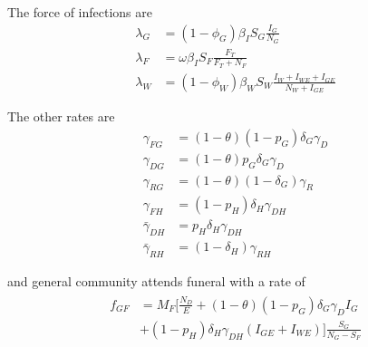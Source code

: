 \documentclass[11pt]{article}
\begin{document}
The force of infections are
\begin{align}
\lambda_G &  = (1-\phi_G)\beta_I S_G \frac{I_G}{N_G} \\
\lambda_F & = \omega \beta_I S_F \frac{F_T}{F_T+N_F} \\
\lambda_W & = (1-\phi_W)\beta_W S_W \frac{I_W+I_{WE}+I_{GE}}{N_W+I_{GE}}
\end{align}


The other rates are
\begin{align}
\gamma_{FG} &  = (1-\theta)(1-p_G)\delta_G \gamma_D  \\
\gamma_{DG} & = (1-\theta)p_G\delta_G \gamma_D \\
\gamma_{RG} & = (1-\theta)(1-\delta_G) \gamma_R \\
\gamma_{FH} & = (1-p_H)\delta_H \gamma_{DH} \\
\bar{\gamma}_{DH} & = p_H \delta_H \gamma_{DH} \\
\bar{\gamma}_{RH} & = (1-\delta_H) \gamma_{RH}
\end{align}

and general community attends funeral with a rate of 
\begin{eqnarray}
\begin{split}
f_{GF} & = M_F  \Bigg[\frac{N_D}{E} + (1-\theta)(1-p_G)\delta_G
  \gamma_DI_G  \\
& + (1-p_H)\delta_H \gamma_{DH}(I_{GE}+I_{WE}) \Bigg] \frac{S_G}{N_G-S_F}
\end{split}
\end{eqnarray}
\end{document}
